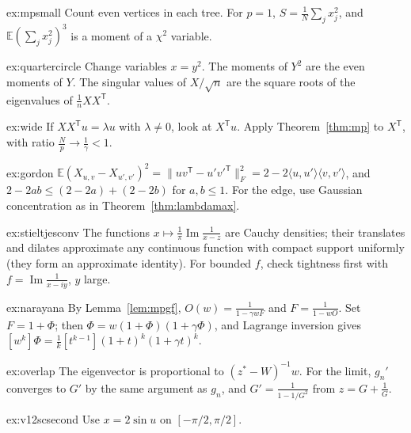 \begin{hint}{ex:mpsmall}
Count even vertices in each tree. For $p=1$, $S=\frac1N\sum_jx_j^2$, and $\mathbb E(\sum_jx_j^2)^3$ is a moment of a $\chi^2$ variable.
\end{hint}

\begin{hint}{ex:quartercircle}
Change variables $x=y^2$. The moments of $Y^2$ are the even moments of $Y$. The singular values of $X/\sqrt n$ are the square roots of the eigenvalues of $\frac1nXX^{\mathsf T}$.
\end{hint}

\begin{hint}{ex:wide}
If $XX^{\mathsf T}u=\lambda u$ with $\lambda\ne0$, look at $X^{\mathsf T}u$. Apply Theorem~\ref{thm:mp} to $X^{\mathsf T}$, with ratio $\frac Np\to\frac1\gamma<1$.
\end{hint}

\begin{hint}{ex:gordon}
$\mathbb E(X_{u,v}-X_{u',v'})^2=\|uv^{\mathsf T}-u'v'^{\mathsf T}\|_F^2=2-2\langle u,u'\rangle\langle v,v'\rangle$, and $2-2ab\le(2-2a)+(2-2b)$ for $a,b\le1$. For the edge, use Gaussian concentration as in Theorem~\ref{thm:lambdamax}.
\end{hint}

\begin{hint}{ex:stieltjesconv}
The functions $x\mapsto\frac1\pi\operatorname{Im}\frac1{x-z}$ are Cauchy densities; their translates and dilates approximate any continuous function with compact support uniformly (they form an approximate identity). For bounded
$f$, check tightness first with $f=\operatorname{Im}\frac1{x-iy}$, $y$ large.
\end{hint}

\begin{hint}{ex:narayana}
By Lemma~\ref{lem:mpgf}, $O(w)=\frac1{1-\gamma wF}$ and $F=\frac1{1-wO}$. Set $F=1+\Phi$; then $\Phi=w(1+\Phi)(1+\gamma\Phi)$, and Lagrange inversion gives $[w^k]\Phi=\frac1k[t^{k-1}](1+t)^k(1+\gamma t)^k$.
\end{hint}

\begin{hint}{ex:overlap}
The eigenvector is proportional to $(z^*-W)^{-1}w$. For the limit, $g_n'$ converges to $G'$ by the same argument as $g_n$, and $G'=\frac1{1-1/G^2}$ from $z=G+\frac1G$.
\end{hint}

\begin{hint}{ex:v12scsecond}
Use $x=2\sin u$ on $[-\pi/2,\pi/2]$.
\end{hint}

